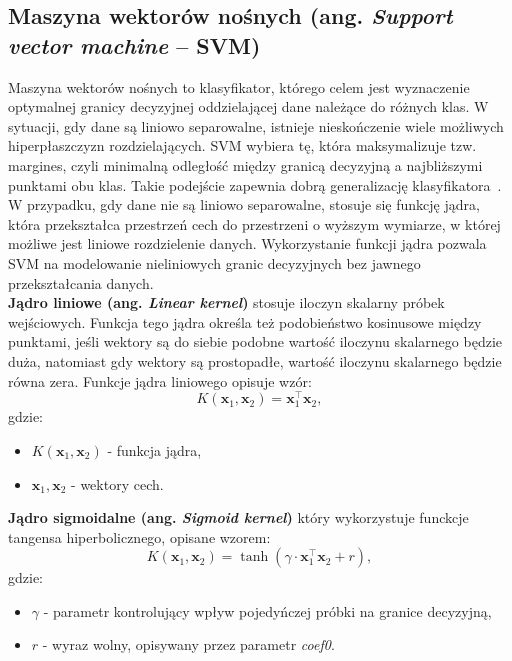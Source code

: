 \documentclass[a4paper,twoside,12pt]{book}
\newcommand{\obcy}[1]{\emph{#1}}
\newcommand{\english}[1]{{\selectlanguage{british}\obcy{#1}}}
\begin{document}
\subsection*{Maszyna wektorów nośnych (ang. \english{Support vector machine} -- SVM)}
Maszyna wektorów nośnych to klasyfikator, którego celem jest wyznaczenie optymalnej granicy decyzyjnej oddzielającej dane należące do różnych klas. W sytuacji, gdy dane są liniowo separowalne, istnieje nieskończenie wiele możliwych hiperpłaszczyzn rozdzielających. SVM wybiera tę, która maksymalizuje tzw. margines, czyli minimalną odległość między granicą decyzyjną a najbliższymi punktami obu klas. Takie podejście zapewnia dobrą generalizację klasyfikatora~\cite{James2021}.\\

W przypadku, gdy dane nie są liniowo separowalne, stosuje się funkcję jądra, która przekształca przestrzeń cech do przestrzeni o wyższym wymiarze, w której możliwe jest liniowe rozdzielenie danych. Wykorzystanie funkcji jądra pozwala SVM na modelowanie nieliniowych granic decyzyjnych bez jawnego przekształcania danych.\\


\newpage
\textbf{Jądro liniowe (ang. \english{Linear kernel})} stosuje iloczyn skalarny próbek wejściowych. Funkcja tego jądra określa też podobieństwo kosinusowe między punktami, jeśli wektory są do siebie podobne wartość iloczynu skalarnego będzie duża, natomiast gdy wektory są prostopadłe, wartość iloczynu skalarnego będzie równa zera. Funkcje jądra liniowego opisuje wzór:
\begin{equation}
	K(\mathbf{x}_1, \mathbf{x}_2) = \mathbf{x}_1^\top \mathbf{x}_2,
\end{equation}
\noindent gdzie:
\begin{itemize}
	\item $K(\mathbf{x}_1, \mathbf{x}_2)$ - funkcja jądra,
	\item $\mathbf{x}_1, \mathbf{x}_2$ - wektory cech.
\end{itemize}

\textbf{Jądro sigmoidalne (ang. \english{Sigmoid kernel})} który wykorzystuje funckcje tangensa hiperbolicznego, opisane wzorem:
\begin{equation}
	K(\mathbf{x}_1, \mathbf{x}_2) = \tanh(\gamma \cdot
	\mathbf{x}_1^\top\mathbf{x}_2 + r),
\end{equation}
\noindent gdzie:
\begin{itemize}
	\item $\gamma$ - parametr kontrolujący wpływ pojedyńczej próbki na granice decyzyjną,
	\item $r$ - wyraz wolny, opisywany przez parametr \textit{coef0}.
\end{itemize}
\end{document}
